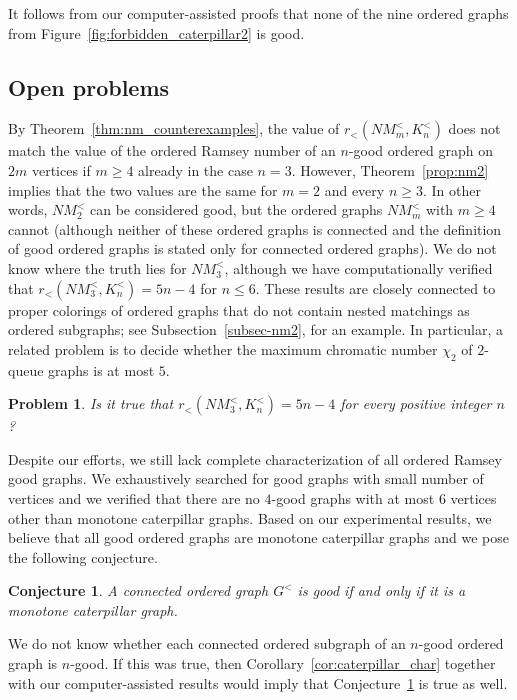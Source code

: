 \documentclass[11pt,a4paper]{article}
\newtheorem{problem}[thm]{Problem}
\newtheorem{conjecture}[thm]{Conjecture}
\theoremstyle{remark}
\begin{document}
It follows from our computer-assisted proofs that none of the nine ordered graphs from Figure~\ref{fig:forbidden_caterpillar2} is good.



\subsection{Open problems}

By Theorem~\ref{thm:nm_counterexamples}, the value of $r_<(NM^<_m,K^<_n)$ does not match the value of the ordered Ramsey number of an $n$-good ordered graph on $2m$ vertices if $m \geq 4$ already in the case $n=3$.
However, Theorem~\ref{prop:nm2} implies that the two values are the same for $m=2$ and every $n \geq 3$.
In other words, $NM^<_2$ can be considered good, but the ordered graphs $NM^<_m$ with $m \geq 4$ cannot (although neither of these ordered graphs is connected and the definition of good ordered graphs is stated only for connected ordered graphs).
We do not know where the truth lies for $NM^<_3$, although we have computationally verified that $r_<(NM^<_3,K^<_n) = 5n-4$ for $n \leq 6$. 
These results are closely connected to proper colorings of ordered graphs that do not contain nested matchings as ordered subgraphs; see Subsection~\ref{subsec-nm2}, for an example.
In particular, a related problem is to decide whether the maximum chromatic number $\chi_2$ of $2$-queue graphs is at most $5$.

\begin{problem}
\label{nm3}
Is it true that $r_<(NM^<_3,K^<_n) = 5n-4$ for every positive integer $n$?
\end{problem}



Despite our efforts, we still lack complete characterization of all ordered Ramsey good graphs.
We exhaustively searched for good graphs with small number of vertices and we verified that there are no $4$-good graphs with at most 6 vertices other than monotone caterpillar graphs.
Based on our experimental results, we believe that all good ordered graphs are monotone caterpillar graphs and we pose the following conjecture.

\begin{conjecture}
\label{conj:caterpillar}
A connected ordered graph $G^<$ is good if and only if it is a monotone caterpillar graph.
\end{conjecture}

We do not know whether each connected ordered subgraph of an $n$-good ordered graph is $n$-good.
If this was true, then Corollary~\ref{cor:caterpillar_char} together with our computer-assisted results would imply that Conjecture~\ref{conj:caterpillar} is true as well.
\end{document}
